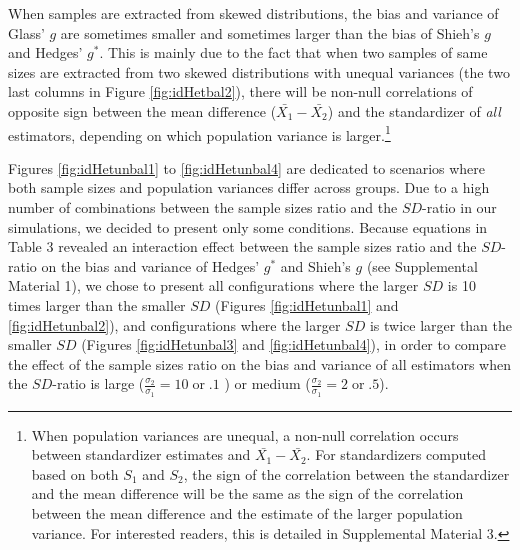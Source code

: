 \documentclass[
  english,
  man,floatsintext]{apa6}
\begin{document}
When samples are extracted from skewed distributions, the bias and variance of Glass' \(g\) are sometimes smaller and sometimes larger than the bias of Shieh's \(g\) and Hedges' \(g^*\). This is mainly due to the fact that when two samples of same sizes are extracted from two skewed distributions with unequal variances (the two last columns in Figure \ref{fig:idHetbal2}), there will be non-null correlations of opposite sign between the mean difference (\(\bar{X_1}-\bar{X_2}\)) and the standardizer of \emph{all} estimators, depending on which population variance is larger.\footnote{When population variances are unequal, a non-null correlation occurs between standardizer estimates and $\bar{X_1}-\bar{X_2}$. For standardizers computed based on both $S_1$ and $S_2$, the sign of the correlation between the standardizer and the mean difference will be the same as the sign of the correlation between the mean difference and the estimate of the larger population variance. For interested readers, this is detailed in Supplemental Material 3.}

Figures \ref{fig:idHetunbal1} to \ref{fig:idHetunbal4} are dedicated to scenarios where both sample sizes and population variances differ across groups. Due to a high number of combinations between the sample sizes ratio and the \(SD\)-ratio in our simulations, we decided to present only some conditions. Because equations in Table 3 revealed an interaction effect between the sample sizes ratio and the \(SD\)-ratio on the bias and variance of Hedges' \(g^*\) and Shieh's \(g\) (see Supplemental Material 1), we chose to present all configurations where the larger \(SD\) is 10 times larger than the smaller \(SD\) (Figures \ref{fig:idHetunbal1} and \ref{fig:idHetunbal2}), and configurations where the larger \(SD\) is twice larger than the smaller \(SD\) (Figures \ref{fig:idHetunbal3} and \ref{fig:idHetunbal4}), in order to compare the effect of the sample sizes ratio on the bias and variance of all estimators when the \(SD\)-ratio is large (\(\frac{\sigma_2}{\sigma_1}=10 \; \mathrm{or} \; .1\) ) or medium (\(\frac{\sigma_2}{\sigma_1}=2 \; \mathrm{or} \; .5\)).
\end{document}
